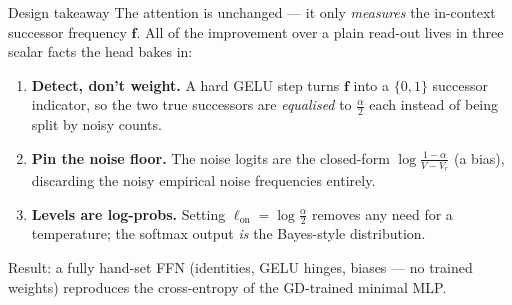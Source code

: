 \documentclass[11pt]{article}
\newcommand{\fvec}{\mathbf{f}}
\begin{document}
\begin{takebox}{Design takeaway}
The attention is unchanged --- it only \emph{measures} the in-context successor frequency $\fvec$.
All of the improvement over a plain read-out lives in three scalar facts the head bakes in:
\begin{enumerate}[nosep,leftmargin=1.4em]
\item \textbf{Detect, don't weight.} A hard GELU step turns $\fvec$ into a $\{0,1\}$ successor
indicator, so the two true successors are \emph{equalised} to $\tfrac{\alpha}{2}$ each instead of
being split by noisy counts.
\item \textbf{Pin the noise floor.} The noise logits are the closed-form $\log\frac{1-\alpha}{V-V_r}$
(a bias), discarding the noisy empirical noise frequencies entirely.
\item \textbf{Levels are log-probs.} Setting $\ell_{\mathrm{on}}=\log\frac{\alpha}{2}$ removes any
need for a temperature; the softmax output \emph{is} the Bayes-style distribution.
\end{enumerate}
Result: a fully hand-set FFN (identities, GELU hinges, biases --- no trained weights) reproduces
the cross-entropy of the GD-trained minimal MLP.
\end{takebox}
\end{document}
